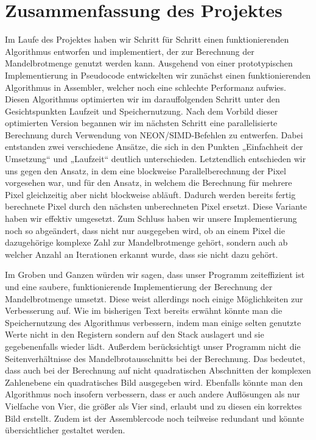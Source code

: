 \documentclass[11pt]{scrartcl}
\begin{document}
\section{Zusammenfassung des Projektes}
Im Laufe des Projektes haben wir Schritt für Schritt einen funktionierenden Algorithmus entworfen und implementiert, der zur Berechnung der Mandelbrotmenge  genutzt werden kann.
Ausgehend von einer prototypischen Implementierung in Pseudocode entwickelten wir zunächst einen funktionierenden Algorithmus in Assembler, welcher noch eine schlechte Performanz aufwies.
Diesen Algorithmus optimierten wir im darauffolgenden Schritt unter den Gesichtspunkten Laufzeit und Speichernutzung.
Nach dem Vorbild dieser optimierten Version begannen wir im nächsten Schritt eine parallelisierte Berechnung durch Verwendung von NEON/SIMD-Befehlen zu entwerfen.
Dabei entstanden zwei verschiedene Ansätze, die sich in den Punkten „Einfachheit der Umsetzung“ und „Laufzeit“ deutlich unterschieden.
Letztendlich entschieden wir uns gegen den Ansatz, in dem eine blockweise Parallelberechnung der Pixel vorgesehen war, und für den Ansatz, in welchem die Berechnung für mehrere Pixel gleichzeitig aber nicht blockweise abläuft.
Dadurch werden bereits fertig berechnete Pixel durch den nächsten unberechneten Pixel ersetzt.
Diese Variante haben wir effektiv umgesetzt.
Zum Schluss haben wir unsere Implementierung noch so abgeändert, dass nicht nur ausgegeben wird, ob an einem Pixel die dazugehörige komplexe Zahl zur Mandelbrotmenge gehört, sondern auch ab welcher Anzahl an Iterationen erkannt wurde, dass sie nicht dazu gehört.


Im Groben und Ganzen würden wir sagen, dass unser Programm zeiteffizient ist und eine saubere, funktionierende Implementierung der Berechnung der Mandelbrotmenge umsetzt.
Diese weist allerdings noch einige Möglichkeiten zur Verbesserung auf.
Wie im bisherigen Text bereits erwähnt könnte man die Speichernutzung des Algorithmus verbessern, indem man einige selten genutzte Werte nicht in den Registern sondern auf den Stack auslagert und sie gegebenenfalls wieder lädt.
Außerdem berücksichtigt unser Programm nicht die Seitenverhältnisse des Mandelbrotausschnitts bei der Berechnung. Das bedeutet, dass auch bei der Berechnung auf nicht quadratischen Abschnitten der komplexen Zahlenebene ein quadratisches Bild ausgegeben wird.
Ebenfalls könnte man den Algorithmus noch insofern verbessern, dass er auch andere Auflösungen als nur Vielfache von Vier, die größer als Vier sind, erlaubt und zu diesen ein korrektes Bild erstellt.
Zudem ist der Assemblercode noch teilweise redundant und könnte übersichtlicher gestaltet werden.
\pagebreak
\end{document}
